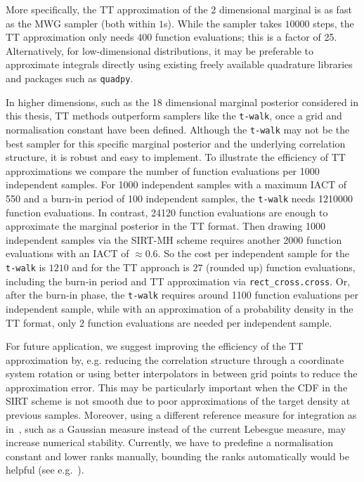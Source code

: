 More specifically, the TT approximation of the 2 dimensional marginal is as fast as the MWG sampler (both within $1$s).
While the sampler takes $10000$ steps, the TT approximation only needs $400$ function evaluations; this is a factor of 25.
Alternatively, for low-dimensional distributions, it may be preferable to approximate integrals directly using existing freely available quadrature libraries and packages such as \texttt{quadpy}.

In higher dimensions, such as the 18 dimensional marginal posterior considered in this thesis, TT methods outperform samplers like the \texttt{t-walk}, once a grid and normalisation constant have been defined.
Although the \texttt{t-walk} may not be the best sampler for this specific marginal posterior and the underlying correlation structure, it is robust and easy to implement.
To illustrate the efficiency of TT approximations we compare the number of function evaluations per 1000 independent samples.
For 1000 independent samples with a maximum IACT of 550 and a burn-in period of 100 independent samples, the \texttt{t-walk} needs 1210000 function evaluations. 
In contrast, 24120 function evaluations are enough to approximate the marginal posterior in the TT format.
Then drawing 1000 independent samples via the SIRT-MH scheme requires another 2000 function evaluations with an IACT of $\approx 0.6$.
So the cost per independent sample for the \texttt{t-walk} is $1210$ and for the TT approach is $27$ (rounded up) function evaluations, including the burn-in period and TT approximation via \texttt{rect\_cross.cross}.
Or, after the burn-in phase, the \texttt{t-walk} requires around 1100 function evaluations per independent sample, while with an approximation of a probability density in the TT format, only 2 function evaluations are needed per independent sample.

For future application, we suggest improving the efficiency of the TT approximation by, e.g. reducing the correlation structure through a coordinate system rotation or using better interpolators in between grid points to reduce the approximation error.
This may be particularly important when the CDF in the SIRT scheme is not smooth due to poor approximations of the target density at previous samples.  
Moreover, using a different reference measure for integration as in~\cite{cui2022deep}, such as a Gaussian measure instead of the current Lebesgue measure, may increase numerical stability.
Currently, we have to predefine a normalisation constant and lower ranks manually, bounding the ranks automatically would be helpful (see e.g.~\cite{Rohrbach2022tterror}).



